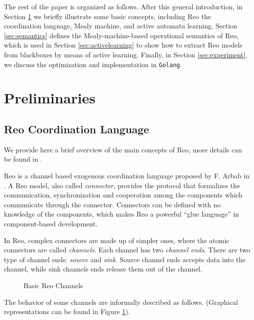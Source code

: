 \documentclass[conference, a4paper]{IEEEtran}
\begin{document}
The rest of the paper is organized as follows. After this general introduction, in Section
\ref{sec:preliminaries} we briefly illustrate some basic concepts, including Reo the coordination
language, Mealy machine, and active automata learning. Section \ref{sec:semantics} defines the
Mealy-machine-based operational semantics of Reo, which is used in Section \ref{sec:activelearning}
to show how to extract Reo models from blackboxes by means of active learning. Finally, in Section
\ref{sec:experiment}, we discuss the optimization and implementation in \texttt{Golang}.

\section{Preliminaries} 
\label{sec:preliminaries}
\subsection{Reo Coordination Language} 
\label{sec:reo}
We provide here a brief overview of the main concepts of Reo, more details can be found in
\cite{DBLP:journals/mscs/Arbab04, DBLP:journals/scp/BaierSAR06}.

Reo is a channel based exogenous coordination language proposed by F. Arbab in
\cite{DBLP:journals/mscs/Arbab04}. 
A Reo model, also called \emph{connector}, provides the protocol
that formalizes the communication, synchronization and cooperation among the components which
communicate through the connector. Connectors can be defined with no knowledge of the components,
which makes Reo a powerful ``glue language'' in component-based
development\cite{DBLP:journals/sigsoft/Gill03}.

In Reo, complex connectors are made up of simpler ones, where the atomic connectors are called
\emph{channels}. Each channel has two \emph{channel ends}. There are two type of channel ends:
\emph{source} and \emph{sink}. Source channel ends accepts data into the channel, while sink
channels ends release them out of the channel. 

\begin{figure}[ht]
  \begin{center}
    
  \end{center}
  \caption{Basic Reo Channels}
  \label{fig:basic}
\end{figure}

The behavior of some channels are informally described as follows. (Graphical representations
can be found in Figure \ref{fig:basic}).
\end{document}

